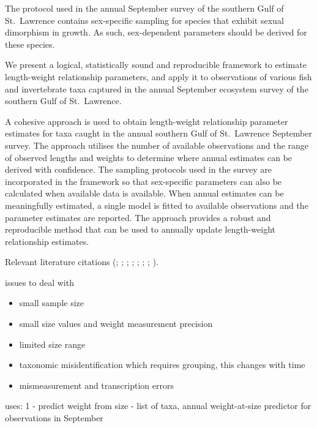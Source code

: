 \documentclass[12pt]{article}\usepackage[]{graphicx}\usepackage[]{color}
\begin{document}
The protocol used in the annual September survey of the southern Gulf of St.~Lawrence contains sex-specific sampling for species that exhibit sexual dimorphism in growth. As such, sex-dependent parameters should be derived for these species.

We present a logical, statistically sound and reproducible framework to estimate length-weight relationship parameters, and apply it to observations of various fish and invertebrate taxa captured in the annual September ecosystem survey of the southern Gulf of St.~Lawrence.

A cohesive approach is used to obtain length-weight relationship parameter estimates for taxa caught in the annual southern Gulf of St.~Lawrence September survey. The approach utilises the number of available observations and the range of observed lengths and weights to determine where annual estimates can be derived with confidence. The sampling protocols used in the survey are incorporated in the framework so that sex-specific parameters can also be calculated when available data is available. When annual estimates can be meaningfully estimated, a single model is fitted to available observations and the parameter estimates are reported. The approach provides a robust and reproducible method that can be used to annually update length-weight relationship estimates.

Relevant literature citations (; ; ; ; ; ; ; ).

issues to deal with
\begin{itemize}

\item
  small sample size
\item
  small size values and weight measurement precision
\item
  limited size range
\item
  taxonomic misidentification which requires grouping, this changes with time
\item
  mismeasurement and transcription errors
\end{itemize}
uses: 1 - predict weight from size - list of taxa, annual weight-at-size predictor for observations in September
\end{document}
